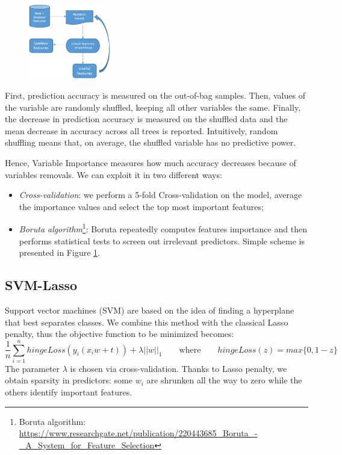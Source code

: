 \documentclass[a4paper,11pt, oneside]{article}  %
\begin{document}
\begin{figure}
	\includegraphics[width=0.318\textwidth]{Boruta-Algorithm.jpg}
	\label{fig2}
\end{figure}
First, prediction accuracy is measured on the out-of-bag samples. Then, values of the variable are randomly shuffled, keeping all other variables the same.  Finally, the decrease in prediction accuracy is measured on the shuffled data and the mean decrease in accuracy across all trees is reported.  Intuitively, random shuffling means that, on average, the shuffled variable has no predictive power. 

Hence, Variable Importance measures how much accuracy decreases because of variables removals. We can exploit it in two different ways:
\begin{itemize}
	\item \textit{Cross-validation}: we perform a 5-fold Cross-validation on the model, average the importance values and select the top most important features;
	\item \textit{Boruta algorithm}\footnote{Boruta algorithm: \url{https://www.researchgate.net/publication/220443685_Boruta_-_A_System_for_Feature_Selection}}: Boruta repeatedly computes features importance and then performs statistical tests to screen out irrelevant predictors. Simple scheme is presented in Figure \ref{fig2}.
\end{itemize} 
\newpage

\subsection{SVM-Lasso}
Support vector machines (SVM) are based on the idea of finding a hyperplane that best separates classes. We combine this method with the classical Lasso penalty, thus the objective function to be minimized becomes:
\begin{equation*}
\dfrac{1}{n} \sum_{i=1}^n hingeLoss(y_i(x_i w + t)) + \lambda ||w||_1  \qquad	\text{where} \qquad  hingeLoss(z) = max\{0, 1-z\}
\end{equation*}
The parameter $\lambda$ is chosen via cross-validation. Thanks to Lasso penalty, we obtain sparsity in predictors: some $w_i$ are shrunken all the way to zero while the others identify important features. 
\medskip
\end{document}
